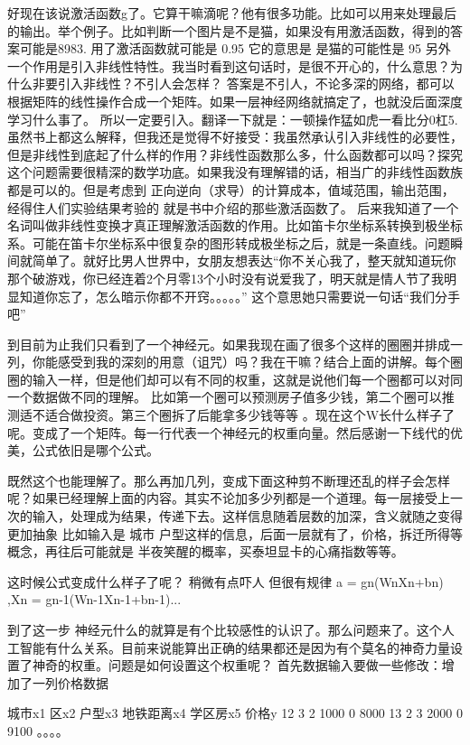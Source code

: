 好现在该说激活函数g了。它算干嘛滴呢？他有很多功能。比如可以用来处理最后的输出。举个例子。比如判断一个图片是不是猫，如果没有用激活函数，得到的答案可能是8983. 用了激活函数就可能是 0.95 它的意思是 是猫的可能性是 95%
另外一个作用是引入非线性特性。我当时看到这句话时，是很不开心的，什么意思？为什么非要引入非线性？不引人会怎样？ 答案是不引人，不论多深的网络，都可以根据矩阵的线性操作合成一个矩阵。如果一层神经网络就搞定了，也就没后面深度学习什么事了。
所以一定要引入。翻译一下就是：一顿操作猛如虎一看比分0杠5. 虽然书上都这么解释，但我还是觉得不好接受：我虽然承认引入非线性的必要性，但是非线性到底起了什么样的作用？非线性函数那么多，什么函数都可以吗？探究这个问题需要很精深的数学功底。如果我没有理解错的话，相当广的非线性函数族都是可以的。但是考虑到 正向逆向（求导）的计算成本，值域范围，输出范围，经得住人们实验结果考验的 就是书中介绍的那些激活函数了。
后来我知道了一个名词叫做非线性变换才真正理解激活函数的作用。比如笛卡尔坐标系转换到极坐标系。可能在笛卡尔坐标系中很复杂的图形转成极坐标之后，就是一条直线。问题瞬间就简单了。就好比男人世界中，女朋友想表达“你不关心我了，整天就知道玩你那个破游戏，你已经连着2个月零13个小时没有说爱我了，明天就是情人节了我明显知道你忘了，怎么暗示你都不开窍。。。。。” 这个意思她只需要说一句话“我们分手吧”


到目前为止我们只看到了一个神经元。如果我现在画了很多个这样的圈圈并排成一列，你能感受到我的深刻的用意（诅咒）吗？我在干嘛？结合上面的讲解。每个圈圈的输入一样，但是他们却可以有不同的权重，这就是说他们每一个圈都可以对同一个数据做不同的理解。
比如第一个圈可以预测房子值多少钱，第二个圈可以推测适不适合做投资。第三个圈拆了后能拿多少钱等等 。现在这个W长什么样子了呢。变成了一个矩阵。每一行代表一个神经元的权重向量。然后感谢一下线代的优美，公式依旧是哪个公式。


既然这个也能理解了。那么再加几列，变成下面这种剪不断理还乱的样子会怎样呢？如果已经理解上面的内容。其实不论加多少列都是一个道理。每一层接受上一次的输入，处理成为结果，传递下去。这样信息随着层数的加深，含义就随之变得更加抽象
比如输入是 城市 户型这样的信息，后面一层就有了，价格，拆迁所得等概念，再往后可能就是 半夜笑醒的概率，买泰坦显卡的心痛指数等等。

这时候公式变成什么样子了呢？ 稍微有点吓人 但很有规律 a = gn(WnXn+bn) ,Xn = gn-1(Wn-1Xn-1+bn-1)... 

到了这一步 神经元什么的就算是有个比较感性的认识了。那么问题来了。这个人工智能有什么关系。目前来说能算出正确的结果都还是因为有个莫名的神奇力量设置了神奇的权重。问题是如何设置这个权重呢？
首先数据输入要做一些修改：增加了一列价格数据

城市x1 区x2 户型x3 地铁距离x4 学区房x5 价格y
12     3    2      1000       0         8000
13     2    3      2000       0         9100
。。。。


